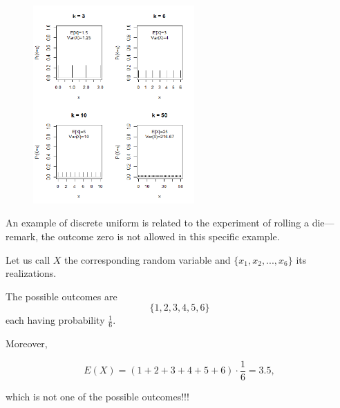 \documentclass[smaller, handout]{beamer}\usepackage[]{graphicx}\usepackage[]{color}
\begin{document}
\begin{frame}{\secname}%

\begin{figure}[ptb]\centering
\includegraphics[width=0.55\textwidth, height=0.8 \textheight]{img/discrete_uniforms__1.pdf}%
\end{figure}
\end{frame}

\begin{frame}{\secname}%

\begin{example}

An example of discrete uniform is related to the experiment of rolling a die---remark, the outcome zero is not allowed in this specific example. \\ \vspace{0.3cm}

Let us call $X$ the corresponding random variable and $\{x_1,x_2,...,x_6\}$ its realizations.  \\ \vspace{0.3cm}

The possible outcomes
are
$$
\{1,2,3,4,5,6\}
$$
each having probability $\frac{1}{6}$. \vspace{0.3cm}

Moreover,

$$
E(X) = (1+2+3+4+5+6) \cdot \frac{1}{6} = 3.5,
$$

which is not one of the possible outcomes!!!

\end{example}

\end{frame}
\end{document}
